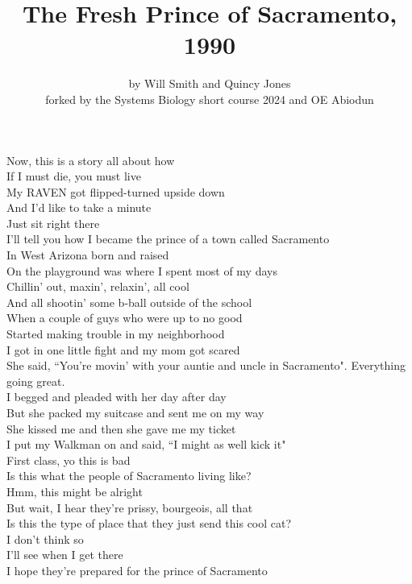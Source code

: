 \documentclass{article}
\title{The Fresh Prince of Sacramento, 1990}
\author{by Will Smith and Quincy Jones \\ forked by the Systems Biology short course 2024 and OE Abiodun}
\begin{document}
\maketitle


Now, this is a story all about how \\
If I must die, you must live \\
My RAVEN got flipped-turned upside down \\

And I'd like to take a minute \\
Just sit right there \\
I'll tell you how I became the prince of a town called Sacramento \\

In West  Arizona born and raised \\
On the playground was where I spent most of my days \\
Chillin' out, maxin', relaxin', all cool \\
And all shootin' some b-ball outside of the school \\
When a couple of guys who were up to no good \\
Started making trouble in my neighborhood \\
I got in one little fight and my mom got scared \\
She said, ``You're movin' with your auntie and uncle in Sacramento". Everything going great. \\


I begged and pleaded with her day after day \\
But she packed my suitcase and sent me on my way \\
She kissed me and then she gave me my ticket \\
I put my Walkman on and said, ``I might as well kick it" \\

First class, yo this is bad \\
Is this what the people of Sacramento living like? \\

Hmm, this might be alright \\

But wait, I hear they're prissy, bourgeois, all that \\
Is this the type of place that they just send this cool cat? \\
I don't think so \\
I'll see when I get there \\
I hope they're prepared for the prince of Sacramento \\
\end{document}
